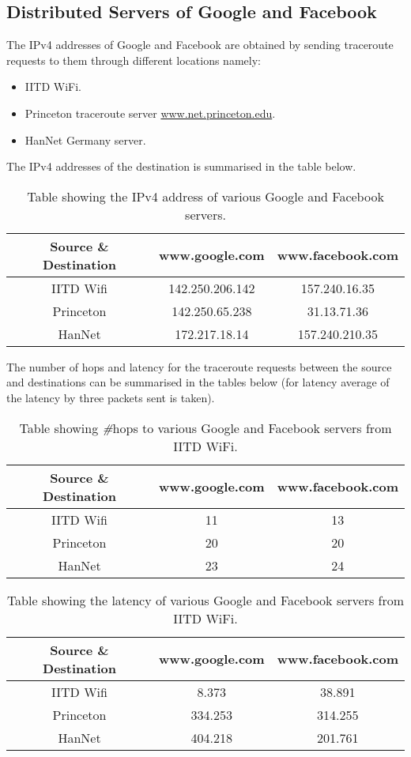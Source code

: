 \documentclass[11pt]{scrartcl}
\begin{document}
\subsection{Distributed Servers of Google and Facebook}
The IPv4 addresses of Google and Facebook are obtained by sending  traceroute requests to them through different locations namely:
\begin{itemize}
    \item IITD WiFi.
    \item Princeton traceroute server \underline{www.net.princeton.edu}.
    \item HanNet Germany server.
\end{itemize}
The IPv4 addresses of the destination is summarised in the table below.

\begin{table}[ht]
\centering
\begin{tabular}{|c|c|c|}
\hline
Source \& Destination & www.google.com & www.facebook.com \\
\hline
IITD Wifi & 142.250.206.142 & 157.240.16.35  \\
\hline
Princeton & 142.250.65.238 & 31.13.71.36 \\
\hline
HanNet &  172.217.18.14 & 157.240.210.35\\
\hline
\end{tabular}
\caption{Table showing the IPv4 address of various Google and Facebook servers.}
\label{tab:simple}
\end{table}


The number of hops and latency for the traceroute requests between the source and destinations can be summarised in the tables below (for latency average of the latency by three packets sent is taken).


\begin{table}[ht]
\centering
\begin{tabular}{|c|c|c|}
\hline
Source \& Destination & www.google.com & www.facebook.com \\
\hline
IITD Wifi & 11 & 13  \\
\hline
Princeton & 20 & 20 \\
\hline
HanNet &  23 & 24\\
\hline
\end{tabular}
\caption{Table showing \textit{\#}hops to various Google and Facebook servers from IITD WiFi.}
\label{tab:simple}
\end{table}




\begin{table}[ht]
\centering
\begin{tabular}{|c|c|c|}
\hline
Source \& Destination & www.google.com & www.facebook.com \\
\hline
IITD Wifi & 8.373 & 38.891  \\
\hline
Princeton & 334.253 & 314.255 \\
\hline
HanNet &  404.218 & 201.761\\
\hline
\end{tabular}
\caption{Table showing the latency of various Google and Facebook servers from IITD WiFi.}
\label{tab:simple}
\end{table}
\end{document}
